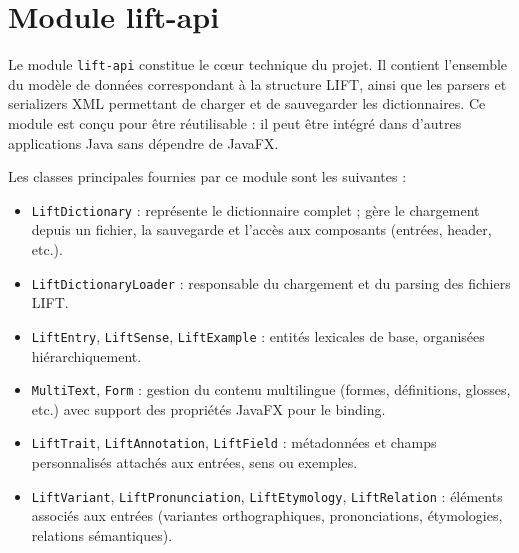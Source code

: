 \documentclass[11pt,twoside,openany]{book}
\begin{document}
\begin{center}
\end{center}

\section{Module lift-api}

Le module \texttt{lift-api} constitue le cœur technique du projet. Il contient l'ensemble du modèle de données correspondant à la structure LIFT, ainsi que les parsers et serializers XML permettant de charger et de sauvegarder les dictionnaires. Ce module est conçu pour être réutilisable : il peut être intégré dans d'autres applications Java sans dépendre de JavaFX.

Les classes principales fournies par ce module sont les suivantes :

\begin{itemize}
\item \texttt{LiftDictionary} : représente le dictionnaire complet ; gère le chargement depuis un fichier, la sauvegarde et l'accès aux composants (entrées, header, etc.).
\item \texttt{LiftDictionaryLoader} : responsable du chargement et du parsing des fichiers LIFT.
\item \texttt{LiftEntry}, \texttt{LiftSense}, \texttt{LiftExample} : entités lexicales de base, organisées hiérarchiquement.
\item \texttt{MultiText}, \texttt{Form} : gestion du contenu multilingue (formes, définitions, glosses, etc.) avec support des propriétés JavaFX pour le binding.
\item \texttt{LiftTrait}, \texttt{LiftAnnotation}, \texttt{LiftField} : métadonnées et champs personnalisés attachés aux entrées, sens ou exemples.
\item \texttt{LiftVariant}, \texttt{LiftPronunciation}, \texttt{LiftEtymology}, \texttt{LiftRelation} : éléments associés aux entrées (variantes orthographiques, prononciations, étymologies, relations sémantiques).
\end{itemize}
\end{document}
